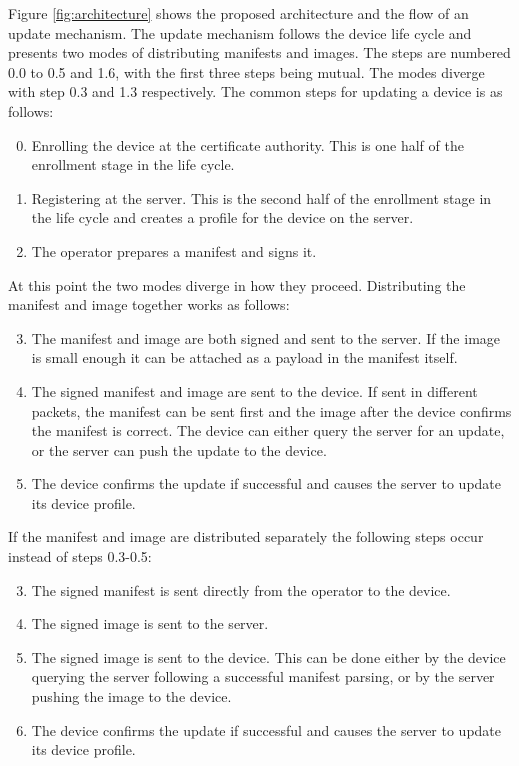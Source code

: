 \documentclass[0-thesis.tex]{subfiles}
\begin{document}
Figure \ref{fig:architecture} shows the proposed architecture and the flow of an update
mechanism. The update mechanism follows the device life cycle and presents two modes of
distributing manifests and images. The steps are numbered 0.0 to 0.5 and 1.6, with the
first three steps being mutual. The modes diverge with step 0.3 and 1.3 respectively. The
common steps for updating a device is as follows:

\begin{enumerate}[label=0.\arabic*]
    \setcounter{enumi}{-1}
    \item Enrolling the device at the certificate authority. This is one half of the
            enrollment stage in the life cycle.
    \item Registering at the server. This is the second half of the enrollment stage
            in the life cycle and creates a profile for the device on the server.
    \item The operator prepares a manifest and signs it.
\end{enumerate}

At this point the two modes diverge in how they proceed. Distributing the manifest and
image together works as follows:

\begin{enumerate}[label=0.\arabic*]
    \setcounter{enumi}{2}
    \item The manifest and image are both signed and sent to the server. If the image
            is small enough it can be attached as a payload in the manifest itself.
    \item The signed manifest and image are sent to the device. If sent in different
            packets, the manifest can be sent first and the image after the device
            confirms the manifest is correct. The device can either query the server for
            an update, or the server can push the update to the device.
    \item The device confirms the update if successful and causes the server to update
            its device profile.
\end{enumerate}

If the manifest and image are distributed separately the following steps occur instead of
steps 0.3-0.5:

\begin{enumerate}[label=1.\arabic*]
    \setcounter{enumi}{2}
    \item The signed manifest is sent directly from the operator to the device.
    \item The signed image is sent to the server.
    \item The signed image is sent to the device. This can be done either by the
        device querying the server following a successful manifest parsing, or by the server
        pushing the image to the device.
    \item The device confirms the update if successful and causes the server to update
    its device profile.
\end{enumerate}
\end{document}
